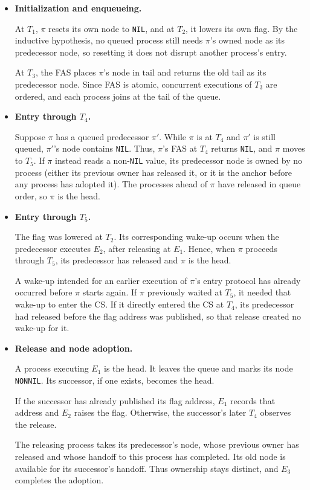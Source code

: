 \documentclass[12pt]{amsproc}
\begin{document}
\begin{itemize}
    \item \textbf{Initialization and enqueueing.}
    
    At $T_1$, $\pi$ resets its own node to \texttt{NIL}, and at $T_2$, it lowers its own flag. 
    By the inductive hypothesis, no queued process still needs $\pi$'s owned node as its predecessor node, so resetting it does not disrupt another process's entry.

    At $T_3$, the FAS places $\pi$'s node in $\mathrm{tail}$ and returns the old tail as its predecessor node. Since FAS is atomic, concurrent executions of $T_3$ are ordered, and each process joins at the tail of the queue. 

    \item \textbf{Entry through $T_4$.}
    
    Suppose $\pi$ has a queued predecessor $\pi'$. While $\pi$ is at $T_4$ and $\pi'$ is still queued, $\pi'$'s node contains \texttt{NIL}. Thus, $\pi$'s FAS at $T_4$ returns \texttt{NIL}, and $\pi$ moves to $T_5$. If $\pi$ instead reads a non-\texttt{NIL} value, its predecessor node is owned by no process (either its previous owner has released it, or it is the anchor before any process has adopted it). The processes ahead of $\pi$ have released in queue order, so $\pi$ is the head.

    \item \textbf{Entry through $T_5$.}
    
    The flag was lowered at $T_2$. Its corresponding wake-up
    occurs when the predecessor executes $E_2$, after releasing
    at $E_1$. Hence, when $\pi$ proceeds through $T_5$, its
    predecessor has released and $\pi$ is the head.

    A wake-up intended for an earlier execution of $\pi$'s entry protocol has already occurred before $\pi$ starts again. If $\pi$ previously waited at $T_5$, it needed that wake-up to enter the CS. If it directly entered the CS at $T_4$, its predecessor had released before the flag address was published, so that release created no wake-up for it.

    \item \textbf{Release and node adoption.}
    
    A process executing $E_1$ is the head. It leaves the queue and marks its node \texttt{NONNIL}. Its successor, if one exists, becomes the head.

    If the successor has already published its flag address, $E_1$ records that address and $E_2$ raises the flag. Otherwise, the successor's later $T_4$ observes the release.

    The releasing process takes its predecessor's node, whose previous owner has released and whose handoff to this process has completed. Its old node is available for its successor's handoff. Thus ownership stays distinct, and $E_3$ completes the adoption.
\end{itemize}
\end{document}

